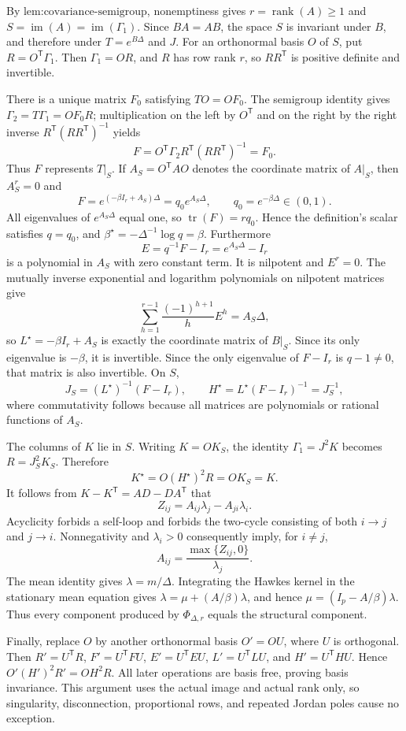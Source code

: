 By \(\text{lem:covariance-semigroup}\), nonemptiness gives \(r=\operatorname{rank}(A)\geq1\) and \(S=\operatorname{im}(A)=\operatorname{im}(\Gamma_1)\).  Since \(BA=AB\), the space \(S\) is invariant under \(B\), and therefore under \(T=e^{B\Delta}\) and \(J\).  For an orthonormal basis \(O\) of \(S\), put \(R=O^{\mathsf T}\Gamma_1\).  Then \(\Gamma_1=OR\), and \(R\) has row rank \(r\), so \(RR^{\mathsf T}\) is positive definite and invertible.

There is a unique matrix \(F_0\) satisfying \(TO=OF_0\).  The semigroup identity gives \(\Gamma_2=T\Gamma_1=OF_0R\); multiplication on the left by \(O^{\mathsf T}\) and on the right by the right inverse \(R^{\mathsf T}(RR^{\mathsf T})^{-1}\) yields
\[
 F=O^{\mathsf T}\Gamma_2R^{\mathsf T}(RR^{\mathsf T})^{-1}=F_0.
\]
Thus \(F\) represents \(T|_S\).  If \(A_S=O^{\mathsf T}AO\) denotes the coordinate matrix of \(A|_S\), then \(A_S^r=0\) and
\[
 F=e^{(-\beta I_r+A_S)\Delta}=q_0e^{A_S\Delta},\qquad q_0=e^{-\beta\Delta}\in(0,1).
\]
All eigenvalues of \(e^{A_S\Delta}\) equal one, so \(\operatorname{tr}(F)=rq_0\).  Hence the definition's scalar satisfies \(q=q_0\), and \(\beta^\star=-\Delta^{-1}\log q=\beta\).  Furthermore
\[
 E=q^{-1}F-I_r=e^{A_S\Delta}-I_r
\]
is a polynomial in \(A_S\) with zero constant term.  It is nilpotent and \(E^r=0\).  The mutually inverse exponential and logarithm polynomials on nilpotent matrices give
\[
 \sum_{h=1}^{r-1}\frac{(-1)^{h+1}}hE^h=A_S\Delta,
\]
so \(L^\star=-\beta I_r+A_S\) is exactly the coordinate matrix of \(B|_S\).  Since its only eigenvalue is \(-\beta\), it is invertible.  Since the only eigenvalue of \(F-I_r\) is \(q-1\neq0\), that matrix is also invertible.  On \(S\),
\[
 J_S=(L^\star)^{-1}(F-I_r),\qquad H^\star=L^\star(F-I_r)^{-1}=J_S^{-1},
\]
where commutativity follows because all matrices are polynomials or rational functions of \(A_S\).

The columns of \(K\) lie in \(S\).  Writing \(K=OK_S\), the identity \(\Gamma_1=J^2K\) becomes \(R=J_S^2K_S\).  Therefore
\[
 K^\star=O(H^\star)^2R=OK_S=K.
\]
It follows from \(K-K^{\mathsf T}=AD-DA^{\mathsf T}\) that
\[
 Z_{ij}=A_{ij}\lambda_j-A_{ji}\lambda_i.
\]
Acyclicity forbids a self-loop and forbids the two-cycle consisting of both \(i\to j\) and \(j\to i\).  Nonnegativity and \(\lambda_i>0\) consequently imply, for \(i\neq j\),
\[
 A_{ij}=\frac{\max\{Z_{ij},0\}}{\lambda_j}.
\]
The mean identity gives \(\lambda=m/\Delta\).  Integrating the Hawkes kernel in the stationary mean equation gives \(\lambda=\mu+(A/\beta)\lambda\), and hence \(\mu=(I_p-A/\beta)\lambda\).  Thus every component produced by \(\Phi_{\Delta,r}\) equals the structural component.

Finally, replace \(O\) by another orthonormal basis \(O'=OU\), where \(U\) is orthogonal.  Then \(R'=U^{\mathsf T}R\), \(F'=U^{\mathsf T}FU\), \(E'=U^{\mathsf T}EU\), \(L'=U^{\mathsf T}LU\), and \(H'=U^{\mathsf T}HU\).  Hence \(O'(H')^2R'=OH^2R\).  All later operations are basis free, proving basis invariance.  This argument uses the actual image and actual rank only, so singularity, disconnection, proportional rows, and repeated Jordan poles cause no exception.